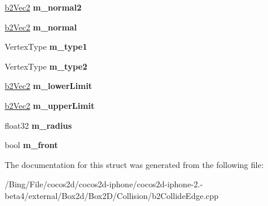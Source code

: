 \begin{DoxyCompactItemize}
\item 
\hypertarget{structb2_e_p_collider_aaec4f7ff250911272c054e3bfe65e08b}{\hyperlink{structb2_vec2}{b2\-Vec2} {\bfseries m\-\_\-normal2}}\label{structb2_e_p_collider_aaec4f7ff250911272c054e3bfe65e08b}

\item 
\hypertarget{structb2_e_p_collider_a67ff23f9fada3a733928380da8653348}{\hyperlink{structb2_vec2}{b2\-Vec2} {\bfseries m\-\_\-normal}}\label{structb2_e_p_collider_a67ff23f9fada3a733928380da8653348}

\item 
\hypertarget{structb2_e_p_collider_ad2541e4c9358d5ffcaca19b25836392b}{Vertex\-Type {\bfseries m\-\_\-type1}}\label{structb2_e_p_collider_ad2541e4c9358d5ffcaca19b25836392b}

\item 
\hypertarget{structb2_e_p_collider_a71889f34bef412e3cbfbbab605210b7e}{Vertex\-Type {\bfseries m\-\_\-type2}}\label{structb2_e_p_collider_a71889f34bef412e3cbfbbab605210b7e}

\item 
\hypertarget{structb2_e_p_collider_a6b48818ac312de825aaf55b46aceea1e}{\hyperlink{structb2_vec2}{b2\-Vec2} {\bfseries m\-\_\-lower\-Limit}}\label{structb2_e_p_collider_a6b48818ac312de825aaf55b46aceea1e}

\item 
\hypertarget{structb2_e_p_collider_a5da77944d10d87ca7222e3d8d00ac205}{\hyperlink{structb2_vec2}{b2\-Vec2} {\bfseries m\-\_\-upper\-Limit}}\label{structb2_e_p_collider_a5da77944d10d87ca7222e3d8d00ac205}

\item 
\hypertarget{structb2_e_p_collider_a1efd359a8c17680bbdef093dd07fbb9d}{float32 {\bfseries m\-\_\-radius}}\label{structb2_e_p_collider_a1efd359a8c17680bbdef093dd07fbb9d}

\item 
\hypertarget{structb2_e_p_collider_aa9443e27e043bf80916992ca96bdedd2}{bool {\bfseries m\-\_\-front}}\label{structb2_e_p_collider_aa9443e27e043bf80916992ca96bdedd2}

\end{DoxyCompactItemize}


The documentation for this struct was generated from the following file\-:\begin{DoxyCompactItemize}
\item 
/\-Bing/\-File/cocos2d/cocos2d-\/iphone/cocos2d-\/iphone-\/2.-\/beta4/external/\-Box2d/\-Box2\-D/\-Collision/b2\-Collide\-Edge.\-cpp\end{DoxyCompactItemize}
